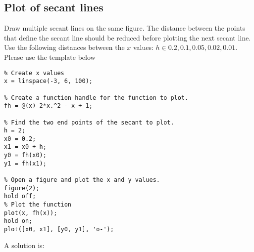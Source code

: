 
\subsection{Plot of secant lines}

\begin{ex}
Draw multiple secant lines on the same figure.
The distance between the points that define the secant line
should be reduced before plotting the next secant line.
Use the following distances between the $x$ values:
$h \in {0.2, 0.1, 0.05, 0.02, 0.01}$.
Please use the template below
\begin{lstlisting}
% Create x values
x = linspace(-3, 6, 100);

% Create a function handle for the function to plot.
fh = @(x) 2*x.^2 - x + 1;

% Find the two end points of the secant to plot.
h = 2;
x0 = 0.2;
x1 = x0 + h;
y0 = fh(x0);
y1 = fh(x1);

% Open a figure and plot the x and y values.
figure(2);
hold off;
% Plot the function
plot(x, fh(x));
hold on;
plot([x0, x1], [y0, y1], 'o-');
\end{lstlisting}
\begin{hint}
\end{hint}
\begin{sol}
A solution is:
\begin{lstlisting}
\end{lstlisting}
\end{sol}
\end{ex}

%
%
%
%
%
%
%
%
%
%
%
%
%
%
%
%
%
%
%
%

